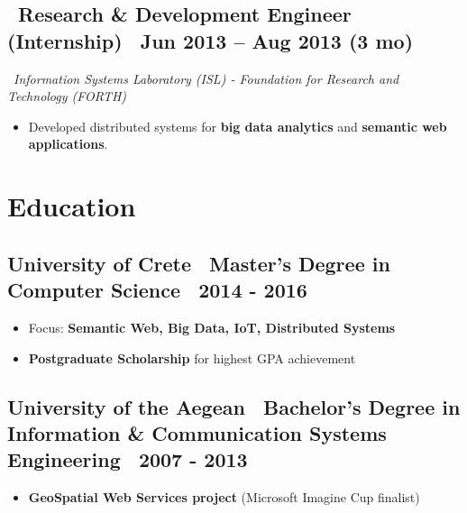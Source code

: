 \documentclass[a4paper,10pt]{article}
\begin{document}
\vspace{1pt}

\subsection*{\faBriefcase\ \textbf{Research \& Development Engineer (Internship)} \hfill \faCalendar\ Jun 2013 – Aug 2013 (3 mo)}
\faBuilding\ \textit{Information Systems Laboratory (ISL) - Foundation for Research and Technology (FORTH)} 
\vspace{1pt}
\begin{adjustwidth}{1em}{1em}
    \begin{itemize}[left=0pt]
        \item Developed distributed systems for \textbf{big data analytics} and \textbf{semantic web applications}.
    \end{itemize}
\end{adjustwidth}


\vspace{1pt}

\section*{ Education}

\subsection*{University of Crete \textbar\ Master's Degree in Computer Science \textbar\ 2014 - 2016}
\begin{itemize}[left=0pt]
    \item Focus: \textbf{Semantic Web, Big Data, IoT, Distributed Systems}
    \item \textbf{Postgraduate Scholarship} for highest GPA achievement
\end{itemize}

\subsection*{University of the Aegean \textbar\ Bachelor's Degree in Information \& Communication Systems Engineering \textbar\ 2007 - 2013}
\begin{itemize}[left=0pt]
    \item \textbf{GeoSpatial Web Services project} (Microsoft Imagine Cup finalist)
\end{itemize}
\end{document}
